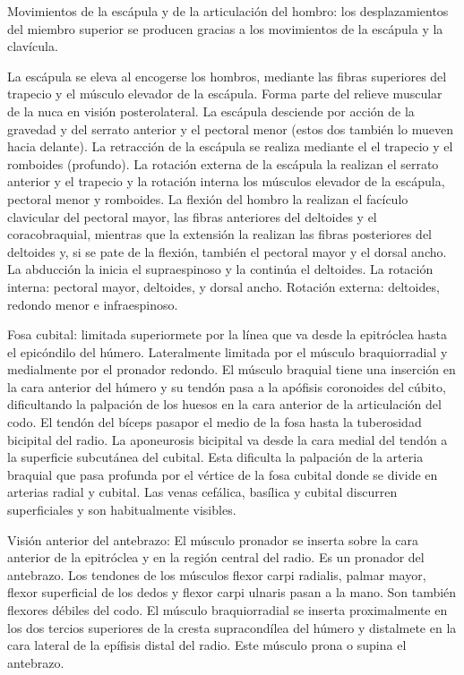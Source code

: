 \documentclass[a4paper,12pt]{article} %
\begin{document}
Movimientos de la escápula y de la articulación del hombro: los desplazamientos del miembro superior se producen gracias a los movimientos de la escápula y la clavícula.

La escápula se eleva al encogerse los hombros, mediante las fibras superiores del trapecio y el músculo elevador de la escápula. Forma parte del relieve muscular de la nuca en visión posterolateral. La escápula desciende por acción de la gravedad y del serrato anterior y el pectoral menor (estos dos también lo mueven hacia delante). La retracción de la escápula se realiza mediante el el trapecio y el romboides (profundo). La rotación externa de la escápula la realizan el serrato anterior y el trapecio y la rotación interna los músculos elevador de la escápula, pectoral menor y romboides. La flexión del hombro la realizan el facículo clavicular del pectoral mayor, las fibras anteriores del deltoides y el coracobraquial, mientras que la extensión la realizan las fibras posteriores del deltoides y, si se pate de la flexión, también el pectoral mayor y el dorsal ancho. La abducción la inicia el supraespinoso y la continúa el deltoides. La rotación interna: pectoral mayor, deltoides, y dorsal ancho. Rotación externa: deltoides, redondo menor e infraespinoso.

Fosa cubital: limitada superiormete por la línea que va desde la epitróclea hasta el epicóndilo del húmero. Lateralmente limitada por el músculo braquiorradial y medialmente por el pronador redondo.
El músculo braquial tiene una inserción en la cara anterior del húmero y su tendón pasa a la apófisis coronoides del cúbito, dificultando la palpación de los huesos en la cara anterior de la articulación del codo. El tendón del bíceps pasapor el medio de la fosa hasta la tuberosidad bicipital del radio. La aponeurosis bicipital va desde la cara medial del tendón a la superficie subcutánea del cubital. Esta dificulta la palpación de la arteria braquial que pasa profunda por el vértice de la fosa cubital donde se divide en arterias radial y cubital. Las venas cefálica, basílica y cubital discurren superficiales y son habitualmente visibles.

Visión anterior del antebrazo: El músculo pronador se inserta sobre la cara anterior de la epitróclea y en la región central del radio. Es un pronador del antebrazo. Los tendones de los músculos flexor carpi radialis, palmar mayor, flexor superficial de los dedos y flexor carpi ulnaris pasan a la mano. Son también flexores débiles del codo.
El músculo braquiorradial se inserta proximalmente  en los dos tercios superiores de la cresta supracondílea del húmero y distalmete en la cara lateral de la epífisis distal del radio. Este músculo prona o supina el antebrazo.
\end{document}
